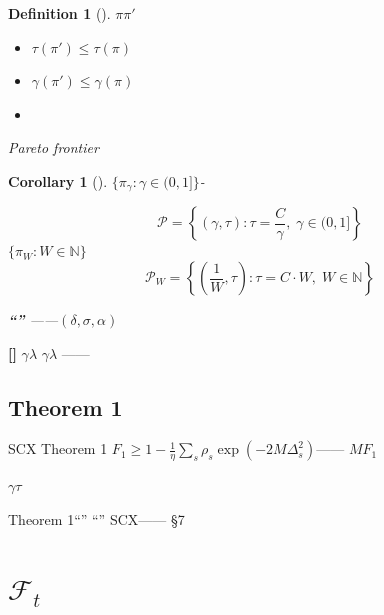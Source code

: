 \documentclass[11pt,a4paper]{article}
\newtheorem{corollary}[theorem]{Corollary}
\newtheorem{definition}[theorem]{Definition}
\theoremstyle{remark}
\newcommand{\N}{\mathbb{N}}
\newcommand{\Fforget}{\mathcal{F}}
\newcommand{\heuristic}{\textnormal{\textbf{[]}}}
\begin{document}
\begin{definition}[]\label{def:pareto_optimal}
$\pi$\textbf{}$\pi'$
\begin{itemize}
    \item $\tau(\pi') \leq \tau(\pi)$
    \item $\gamma(\pi') \leq \gamma(\pi)$
    \item 
\end{itemize}
\textbf{}Pareto frontier
\end{definition}

\begin{corollary}[]\label{cor:pareto_frontier}
$\{\pi_\gamma : \gamma \in (0, 1]\}$-

\begin{equation}
    \mathcal{P} = \left\{(\gamma, \tau) : \tau = \frac{C}{\gamma}, \; \gamma \in (0, 1]\right\}
\end{equation}
$\{\pi_W : W \in \N\}$\textbf{}
\begin{equation}
    \mathcal{P}_W = \left\{\left(\frac{1}{W}, \tau\right) : \tau = C \cdot W, \; W \in \N\right\}
\end{equation}

\textbf{``''}
——$(\delta, \sigma, \alpha)$

\end{corollary}

\heuristic{} \textbf{}
\textbf{}
$\gamma$$\lambda$\textbf{}
$\gamma$$\lambda$
\textbf{}——

\subsection{Theorem 1}

SCX Theorem 1
$F_1 \geq 1 - \frac{1}{\eta}\sum_s \rho_s \exp(-2M\Delta_s^2)$——
\textbf{}$M$\textbf{}$F_1$

\textbf{}$\gamma$\textbf{}$\tau$

Theorem 1``''
``''
SCX——
\S7

\section{$\Fforget_t$}

\subsection{}
\end{document}
